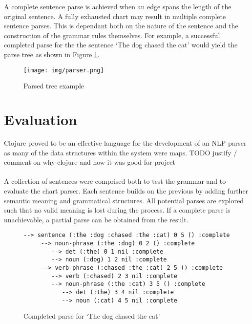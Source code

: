 \documentclass[11pt, a4paper]{article}
\begin{document}
A complete sentence parse is achieved when an edge spans the length of the original sentence. A fully exhausted chart may result in multiple complete sentence parses. This is dependant both on the nature of the sentence and the construction of the grammar rules themselves. For example, a successful completed parse for the the sentence `The dog chased the cat' would yield the parse tree as shown in Figure \ref{fig:parsed-tree}.

\begin{figure}[H]
	\center
	\texttt{[image: img/parser.png]}
	\caption{Parsed tree example}
	\label{fig:parsed-tree}
\end{figure}

\section{Evaluation}\label{sec:eval}

Clojure proved to be an effective language for the development of an NLP parser as many of the data structures within the system were maps. TODO justify / comment on why clojure and how it was good for project

\paragraph{}



A collection of sentences were comprised both to test the grammar and to evaluate the chart parser. Each sentence builds on the previous by adding further semantic meaning and grammatical structures. All potential parses are explored such that no valid meaning is lost during the process. If a complete parse is unachievable, a partial parse can be obtained from the result.


\begin{figure}[H]
\begin{Verbatim}[frame=leftline]
  --> sentence (:the :dog :chased :the :cat) 0 5 () :complete
     --> noun-phrase (:the :dog) 0 2 () :complete
        --> det (:the) 0 1 nil :complete
        --> noun (:dog) 1 2 nil :complete
     --> verb-phrase (:chased :the :cat) 2 5 () :complete
        --> verb (:chased) 2 3 nil :complete
        --> noun-phrase (:the :cat) 3 5 () :complete
           --> det (:the) 3 4 nil :complete
           --> noun (:cat) 4 5 nil :complete
\end{Verbatim}
\caption{Completed parse for `The dog chased the cat'}
\label{fig:sentenceBasic}
\end{figure}
\end{document}
